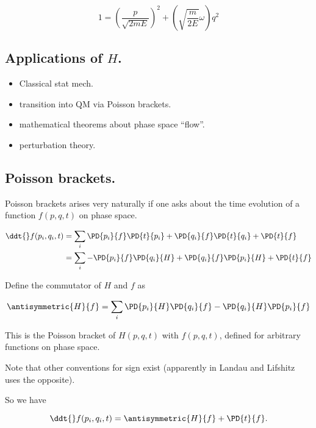 \begin{equation}\label{eqn:phaseSpaceAndTrajectories:50}
1 = \left( \frac{p}{\sqrt{2 m E}}\right)^2 + \left(\sqrt{\frac{m}{2 E}} \omega\right) q^2
\end{equation}

\subsection{Applications of $H$.}

\begin{itemize}
\item Classical stat mech.
\item transition into QM via Poisson brackets.
\item mathematical theorems about phase space ``flow''.
\item perturbation theory.
\end{itemize}

\subsection{Poisson brackets.}

Poisson brackets arises very naturally if one asks about the time evolution of a function $f(p, q, t)$ on phase space.

\begin{align*}
\ddt{} f(p_i, q_i, t)
&=
\sum_i
 \PD{p_i}{f} \PD{t}{p_i}
+ \PD{q_i}{f} \PD{t}{q_i}
+ \PD{t}{f} \\
&=
\sum_i
- \PD{p_i}{f} \PD{q_i}{H}
+ \PD{q_i}{f} \PD{p_i}{H}
+ \PD{t}{f}
\end{align*}

Define the commutator of $H$ and $f$ as

\begin{equation}\label{eqn:phaseSpaceAndTrajectories:70}
\antisymmetric{H}{f} =
\sum_i
\PD{p_i}{H}
\PD{q_i}{f}
-
\PD{q_i}{H}
\PD{p_i}{f}
\end{equation}

This is the Poisson bracket of $H(p,q,t)$ with $f(p,q,t)$, defined for arbitrary functions on phase space.

Note that other conventions for sign exist (apparently in Landau and Lifshitz uses the opposite).

So we have

\begin{equation}\label{eqn:phaseSpaceAndTrajectories:90}
\ddt{} f(p_i, q_i, t) = \antisymmetric{H}{f} + \PD{t}{f}.
\end{equation}

